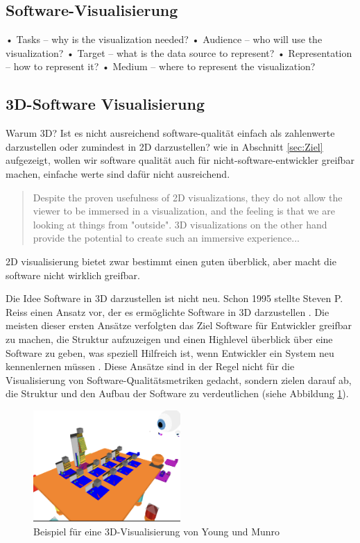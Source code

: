 \subsection{Software-Visualisierung} \label{sec:SoftwareVisualisierung} 

• Tasks – why is the visualization needed?
• Audience – who will use the visualization?
• Target – what is the data source to represent?
• Representation – how to represent it?
• Medium – where to represent the visualization?
\cite[2]{3dsoftwareMarcus}

\subsection{3D-Software Visualisierung} \label{sec:3DSoftwareVisualisierung}   
Warum 3D? Ist es nicht ausreichend software-qualität einfach als zahlenwerte darzustellen oder zumindest in 2D darzustellen?
wie in Abschnitt \ref{sec:Ziel} aufgezeigt, wollen wir software qualität auch für nicht-software-entwickler greifbar machen, einfache werte sind dafür nicht ausreichend.
\begin{quote}
Despite the proven usefulness of 2D visualizations, they do not allow the viewer to be immersed in a visualization, and the feeling is that we are looking at things from "outside". 3D visualizations on the other hand provide the potential to create such an immersive experience... \cite[1]{codeCity1}
\end{quote}
2D visualisierung bietet zwar bestimmt einen guten überblick, aber macht die software nicht wirklich greifbar. 

Die Idee Software in 3D darzustellen ist nicht neu. Schon 1995 stellte Steven P. Reiss einen Ansatz vor, der es ermöglichte Software in 3D darzustellen \cite{first_3D_vis}. Die meisten dieser ersten Ansätze verfolgten das Ziel Software für Entwickler greifbar zu machen, die Struktur aufzuzeigen und einen Highlevel überblick über eine Software zu geben, was speziell Hilfreich ist, wenn Entwickler ein System neu kennenlernen müssen \cite{visSoftwareVR}.  Diese Ansätze sind in der Regel nicht für die Visualisierung von Software-Qualitätsmetriken gedacht, sondern zielen darauf ab, die Struktur und den Aufbau der Software zu verdeutlichen (siehe Abbildung \ref{fig:3DVis}).  

\begin{figure}[h]
    \centering
    \includegraphics[width=0.5\textwidth]{images/visVRExample.png}
    \caption{Beispiel für eine 3D-Visualisierung von Young und Munro \cite[6]{visSoftwareVR}}
    \label{fig:3DVis}
\end{figure}

